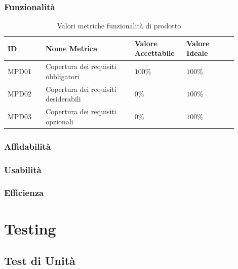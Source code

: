 \documentclass[a4paper,12pt]{article}
\begin{document}
            \subsubsection{Funzionalità}
                \begin{longtable}{|M{0.15\linewidth}|M{0.35\linewidth}|M{0.2\linewidth}|M{0.2\linewidth}|}

                    \caption{Valori metriche funzionalità di prodotto} \\
                    \hline
                    \textbf{ID} & \textbf{Nome Metrica} & \textbf{Valore Accettabile} & \textbf{Valore Ideale} \\
                    \hline
                    \endhead

                    MPD01 & Copertura dei requisiti obbligatori & $100\%$ & $100\%$ \\
                    \hline

                    MPD02 & Copertura dei requisiti desiderabili & $0\%$ & $100\%$ \\
                    \hline

                    MPD03 & Copertura dei requisiti opzionali & $0\%$ & $100\%$ \\
                    \hline

                \end{longtable}

            \subsubsection{Affidabilità}


            \subsubsection{Usabilità}


            \subsubsection{Efficienza}
            
\newpage
    \section{Testing}
        \subsection{Test di Unità}
\end{document}
